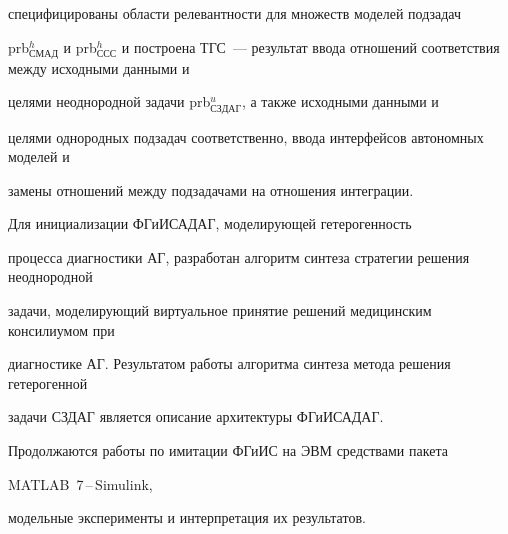 специфицированы области релевантности для множеств моделей подзадач


prb$^h_{\mathrm{СМАД}}$ и prb$^h_{\mathrm{ССС}}$ и построена ТГС~--- результат ввода отношений соответствия между исходными данными и


целями неоднородной задачи prb$^u_{\mathrm{СЗДАГ}}$, а также исходными данными и


целями однородных подзадач соответственно, ввода интерфейсов автономных моделей и


замены отношений между подзадачами на отношения интеграции.





 Для инициализации ФГиИСАДАГ, моделирующей гетерогенность


процесса диагностики АГ, разработан алгоритм синтеза стратегии решения неоднородной


задачи, моделирующий виртуальное принятие решений медицинским консилиумом при


диагностике АГ. Результатом работы алгоритма синтеза метода решения гетерогенной


задачи СЗДАГ является описание архитектуры ФГиИСАДАГ.





 Продолжаются работы по имитации ФГиИС на ЭВМ средствами пакета


\mbox{MATLAB}~7\,--\,Simulink,


 модельные эксперименты и интерпретация их результатов.






